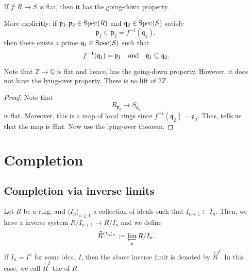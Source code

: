 \documentclass[12pt]{article}
\begin{document}
\begin{thm}
	If $f : R \to S$ is flat, then it has the going-down property.

	More explicitly: if $\mathfrak{p}_{1}, \mathfrak{p}_{2} \in \operatorname{Spec}(R)$ and $\mathfrak{q}_{2} \in \operatorname{Spec}(S)$ satisfy
	\begin{equation*} 
		\mathfrak{p}_{1} \subset \mathfrak{p}_{2} = f^{-1}(\mathfrak{q}_{2}),
	\end{equation*}
	then there exists a prime $\mathfrak{q}_{1} \in \operatorname{Spec}(S)$ such that 
	\begin{equation*} 
		f^{-1}(\mathfrak{q}_{1}) = \mathfrak{p}_{1} \quad\text{and}\quad \mathfrak{q}_{1} \subseteq \mathfrak{q}_{2}.
	\end{equation*}
\end{thm}

Note that $\mathbb{Z} \to \mathbb{Q}$ is flat and hence, has the going-down property. However, it does not have the lying-over property. There is no lift of $2 \mathbb{Z}$.

\begin{proof} 
	Note that
	\begin{equation*} 
		R_{\mathfrak{p}_{2}} \to S_{\mathfrak{q}_{2}}
	\end{equation*}
	is flat. Moreover, this is a map of local rings since $f^{-1}(\mathfrak{q}_{2}) = \mathfrak{p}_{2}$. Thus,  tells us that the map is fflat. Now use the lying-over theorem.
\end{proof}

\section{Completion}

\subsection{Completion via inverse limits}

\begin{defn}
	Let $R$ be a ring, and $\langle I_{n} \rangle_{n \ge 1}$ a collection of ideals such that $I_{n + 1} \subset I_{n}$. Then, we have a inverse system $R/I_{n + 1} \to R/I_{n}$ and we define
	\begin{equation*} 
		\widehat{R}^{\langle I_{n} \rangle_{n}} \vcentcolon= \varprojlim_{n} R/I_{n}.
	\end{equation*}
	If $I_{n} = I^{n}$ for some ideal $I$, then the above inverse limit is denoted by $\widehat{R}^{I}$. In this case, we call $\widehat{R}^{I}$ the  of $R$.
\end{defn}
\end{document}
